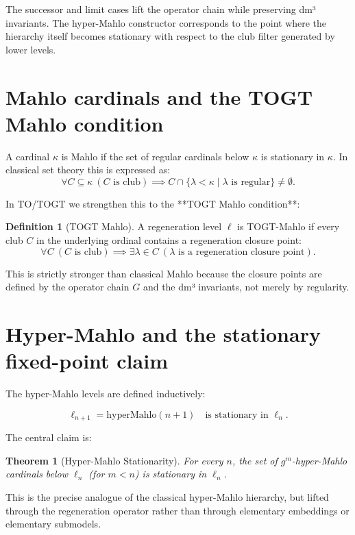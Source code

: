 \documentclass[19pt]{book}
\theoremstyle{plain}
\newtheorem{theorem}{Theorem}[section]
\theoremstyle{definition}
\newtheorem{definition}{Definition}[section]
\theoremstyle{remark}
\begin{document}
\begin{enumerate}
The successor and limit cases lift the operator chain while preserving dm³ invariants. The hyper-Mahlo constructor corresponds to the point where the hierarchy itself becomes stationary with respect to the club filter generated by lower levels.

\section{Mahlo cardinals and the TOGT Mahlo condition}

A cardinal \(\kappa\) is Mahlo if the set of regular cardinals below \(\kappa\) is stationary in \(\kappa\). In classical set theory this is expressed as:
\[
\forall C \subseteq \kappa\ (C\text{ is club}) \implies C \cap \{\lambda < \kappa \mid \lambda\text{ is regular}\} \neq \emptyset.
\]

In TO/TOGT we strengthen this to the **TOGT Mahlo condition**:

\begin{definition}[TOGT Mahlo]
A regeneration level \(\ell\) is TOGT-Mahlo if every club \(C\) in the underlying ordinal contains a regeneration closure point:
\[
\forall C\ (C\text{ is club}) \implies \exists \lambda \in C\ (\lambda\text{ is a regeneration closure point}).
\]
\end{definition}

This is strictly stronger than classical Mahlo because the closure points are defined by the operator chain \(G\) and the dm³ invariants, not merely by regularity.

\section{Hyper-Mahlo and the stationary fixed-point claim}

The hyper-Mahlo levels are defined inductively:

\[
\ell_{n+1} = \text{hyperMahlo}(n+1) \quad \text{is stationary in } \ell_n.
\]

The central claim is:

\begin{theorem}[Hyper-Mahlo Stationarity]
For every \(n\), the set of \(g^m\)-hyper-Mahlo cardinals below \(\ell_n\) (for \(m < n\)) is stationary in \(\ell_n\).
\end{theorem}

This is the precise analogue of the classical hyper-Mahlo hierarchy, but lifted through the regeneration operator rather than through elementary embeddings or elementary submodels.


\end{enumerate}
\end{document}
